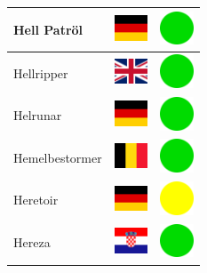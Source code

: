 \documentclass[12pt, a4paper, twoside]{report}
\begin{document}
\begin{center}
\begin{longtable}{|p{5cm}|p{2cm}|p{2cm}|}
 Hell Patröl                                                & \includegraphics[width=1cm]{../img/flags/de} &   \includegraphics[width=1cm]{../likes/y} \\ \hline
 Hellripper                                                 & \includegraphics[width=1cm]{../img/flags/gb} &   \includegraphics[width=1cm]{../likes/y} \\ \hline
 Helrunar                                                   & \includegraphics[width=1cm]{../img/flags/de} &   \includegraphics[width=1cm]{../likes/y} \\ \hline
 Hemelbestormer                                             & \includegraphics[width=1cm]{../img/flags/be} &   \includegraphics[width=1cm]{../likes/y} \\ \hline
 Heretoir                                                   & \includegraphics[width=1cm]{../img/flags/de} &   \includegraphics[width=1cm]{../likes/m} \\ \hline
 Hereza                                                     & \includegraphics[width=1cm]{../img/flags/hr} &   \includegraphics[width=1cm]{../likes/y} \\ \hline

\end{longtable}
\end{center}
\end{document}
